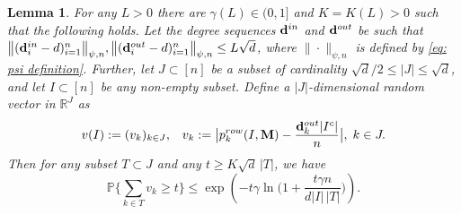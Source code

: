 \documentclass[12pt]{article}
\newtheorem{lemma}[theorem]{Lemma}
\theoremstyle{definition}
\theoremstyle{plain}
\newcommand{\R}{\mathbb{R}}
\def\ranmtx{{\bf{}M}}
\def\Prob{{\mathbb P}}
\def\InDeg{{\bf d}^{in}}
\def\OutDeg{{\bf d}^{out}}
\begin{document}
\begin{lemma}\label{l: concentration sum p-l}
For any $L>0$ there are $\gamma(L)\in(0,1]$ and $K=K(L)>0$ such that the following holds. 
Let the degree sequences $\InDeg$ and $\OutDeg$
be such that $\bigl\|(\InDeg_i-d)_{i=1}^n\bigr\|_{\psi,n},\bigl\|(\OutDeg_i-d)_{i=1}^n\bigr\|_{\psi,n}\leq L\sqrt{d}$,
where $\|\cdot\|_{\psi,n}$ is defined by \eqref{eq: psi definition}.
Further, let $J\subset[n]$ be a subset of cardinality $\sqrt{d}/2\leq |J|\leq \sqrt{d}$, and let $I\subset [n]$
be any non-empty subset. Define a $|J|$-dimensional random vector in $\R^J$ as
$$v(I):=(v_k)_{k\in J},\;\;\;
v_k:=\big|p^{row}_k(I,\ranmtx)-\frac{\OutDeg_k|I^c|}{n}\big|,\;k\in J.$$
Then for any subset $T\subset J$ and any $t \geq K \sqrt{d}\, \vert T\vert$, we have 
$$
\Prob\Big\{\sum_{k\in T} v_k \geq t \Big\} 
\leq \exp\left(-t \gamma\ln \Big(1+\frac{t \gamma n}{d\vert I\vert\, \vert T\vert}\Big)\right).
$$
\end{lemma}
\end{document}
